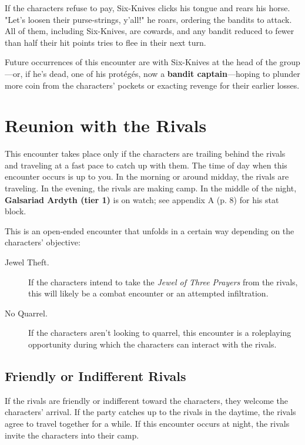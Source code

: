 \documentclass[letterpaper, 11pt, bg=full, twocolumn]{dndbook}
\begin{document}
If the characters refuse to pay, Six-Knives clicks his tongue and rears his horse. "Let's loosen their purse-strings, y'all!" he roars, ordering the bandits to attack. All of them, including Six-Knives, are cowards, and any bandit reduced to fewer than half their hit points tries to flee in their next turn.

Future occurrences of this encounter are with Six-Knives at the head of the group---or, if he's dead, one of his protégés, now a \textbf{bandit captain}---hoping to plunder more coin from the characters' pockets or exacting revenge for their earlier losses.
\section{Reunion with the Rivals}


This encounter takes place only if the characters are trailing behind the rivals and traveling at a fast pace to catch up with them. The time of day when this encounter occurs is up to you. In the morning or around midday, the rivals are traveling. In the evening, the rivals are making camp. In the middle of the night, \textbf{Galsariad Ardyth (tier 1)} is on watch; see appendix A (p. 8) for his stat block.

This is an open-ended encounter that unfolds in a certain way depending on the characters' objective:

\begin{description}
\item[Jewel Theft.] If the characters intend to take the \textit{Jewel of Three Prayers} from the rivals, this will likely be a combat encounter or an attempted infiltration.
\item[No Quarrel.] If the characters aren't looking to quarrel, this encounter is a roleplaying opportunity during which the characters can interact with the rivals.
\end{description}

\subsection{Friendly or Indifferent Rivals}

If the rivals are friendly or indifferent toward the characters, they welcome the characters' arrival. If the party catches up to the rivals in the daytime, the rivals agree to travel together for a while. If this encounter occurs at night, the rivals invite the characters into their camp.
\end{document}
